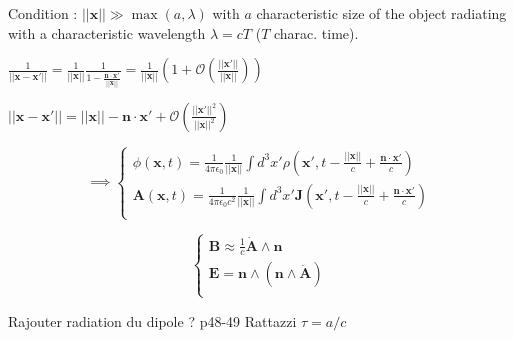 Condition : $||\textbf{x}|| \gg \max(a, \lambda)$ with $a$ characteristic size of the object radiating with a characteristic wavelength $\lambda = cT$ ($T$ charac. time).
\squishlist
    \item $\frac{1}{||\textbf{x}-\textbf{x}'||} = \frac{1}{||\textbf{x}||}\frac{1}{1- \frac{\textbf{n} \cdot \textbf{x}'}{||\textbf{x}||}} = \frac{1}{||\textbf{x}||}\left(1+\mathcal{O}(\frac{||\textbf{x}'||}{||\textbf{x}||})\right)  $
    \item $||\textbf{x}-\textbf{x}'|| = ||\textbf{x}|| - \textbf{n} \cdot \textbf{x}' + \mathcal{O}(\frac{||\textbf{x}'||^2}{||\textbf{x}||^2})$
    \item 
\[      \implies
        \begin{cases}
            \phi(\textbf{x},t) = \frac{1}{4\pi\epsilon_0}\frac{1}{||\textbf{x}||}\int d^3x' \rho(\textbf{x}',t- \frac{||\textbf{x}||}{c} + \frac{\textbf{n} \cdot \textbf{x}'}{c}) \\
            \textbf{A}(\textbf{x},t) = \frac{1}{4\pi\epsilon_0c^2} \frac{1}{||\textbf{x}||} \int d^3x' \textbf{J}(\textbf{x}',t- \frac{||\textbf{x}||}{c} + \frac{\textbf{n} \cdot \textbf{x}'}{c}) \\
        \end{cases}
\]
    \item 
\[        \begin{cases}
            \textbf{B} \approx \frac{1}{c}\dot{\textbf{A}} \wedge \textbf{n} \\
            \textbf{E} = \textbf{n} \wedge (\textbf{n} \wedge \dot{\textbf{A}}) \\
        \end{cases}
\]    
    \item Rajouter radiation du dipole ? p48-49 Rattazzi $\tau = a/c$
\squishend 


